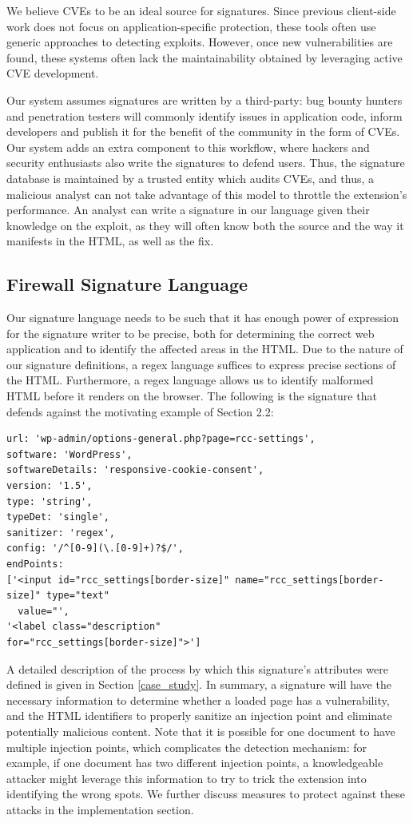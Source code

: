 	 We believe CVEs to be an ideal source for signatures. Since previous client-side work does not focus on application-specific protection, these tools often use generic approaches to detecting exploits. However, once new vulnerabilities are found, these systems often lack the maintainability obtained by leveraging active CVE development. 
	 
	 Our system assumes signatures are written by a third-party: bug bounty hunters and penetration testers will commonly identify issues in application code, inform developers and publish it for the benefit of the community in the form of CVEs. Our system adds an extra component to this workflow, where hackers and security enthusiasts also write the signatures to defend users. Thus, the signature database is maintained by a trusted entity which audits CVEs, and thus, a malicious analyst can not take advantage of this model to throttle the extension's performance. An analyst can write a signature in our language given their knowledge on the exploit, as they will often know both the source and the way it manifests in the HTML, as well as the fix.
 
 \subsection{Firewall Signature Language} \label{signature_language}
 Our signature language needs to be such that it has enough power of expression for the signature writer to be precise, both for determining the correct web application and to identify the affected areas in the HTML. Due to the nature of our signature definitions, a regex language suffices to express precise sections of the HTML. Furthermore, a regex language allows us to identify malformed HTML before it renders on the browser. The following is the signature that defends against the motivating example of Section 2.2:
 \lstset{basicstyle=\small}
\begin{lstlisting}[breaklines=true,caption={An XSnare signature},label={lst:xsnare_signature}]
url: 'wp-admin/options-general.php?page=rcc-settings',
software: 'WordPress',
softwareDetails: 'responsive-cookie-consent',
version: '1.5',
type: 'string',
typeDet: 'single',
sanitizer: 'regex',
config: '/^[0-9](\.[0-9]+)?$/',
endPoints: 
['<input id="rcc_settings[border-size]" name="rcc_settings[border-size]" type="text"
  value="',
'<label class="description" 
for="rcc_settings[border-size]">']
\end{lstlisting}

A detailed description of the process by which this signature's attributes were defined is given in Section \ref{case_study}. In summary, a signature will have the necessary information to determine whether a loaded page has a vulnerability, and the HTML identifiers to properly sanitize an injection point and eliminate potentially malicious content. Note that it is possible for one document to have multiple injection points, which complicates the detection mechanism: for example, if one document has two different injection points, a knowledgeable attacker might leverage this information to try to trick the extension into identifying the wrong spots. We further discuss measures to protect against these attacks in the implementation section.
  
